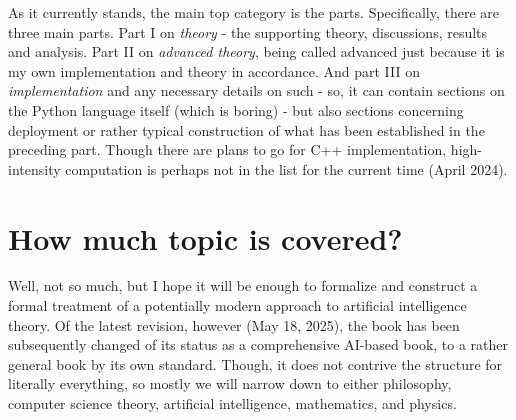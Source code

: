 As it currently stands, the main top category is the parts. Specifically, there are three main parts. Part I on \textit{theory} - the supporting theory, discussions, results and analysis. Part II on \textit{advanced theory}, being called advanced just because it is my own implementation and theory in accordance. And part III on \textit{implementation} and any necessary details on such - so, it can contain sections on the Python language itself (which is boring) - but also sections concerning deployment or rather typical construction of what has been established in the preceding part. Though there are plans to go for C++ implementation, high-intensity computation is perhaps not in the list for the current time (April 2024). 
\section{How much topic is covered?}
Well, not so much, but I hope it will be enough to formalize and construct a formal treatment of a potentially modern approach to artificial intelligence theory. Of the latest revision, however (May 18, 2025), the book has been subsequently changed of its status as a comprehensive AI-based book, to a rather general book by its own standard. Though, it does not contrive the structure for literally everything, so mostly we will narrow down to either philosophy, computer science theory, artificial intelligence, mathematics, and physics. 